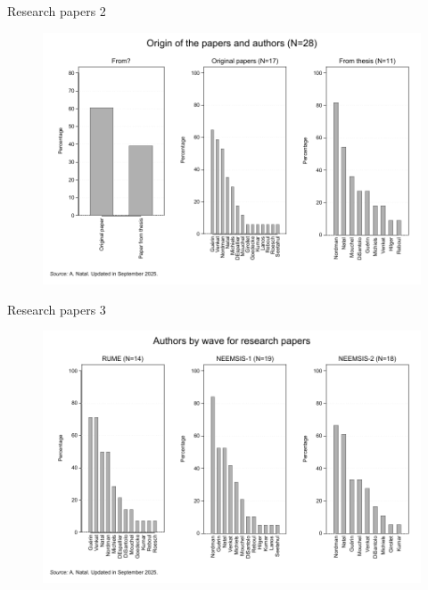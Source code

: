 \documentclass[aspectratio=169]{beamer}
\begin{document}
\begin{frame}{Research papers 2}

\begin{figure}[h]
\centering
\includegraphics[width=0.7\columnwidth]{INPUT/RP_origins}
\end{figure}

\end{frame}



\begin{frame}{Research papers 3}

\begin{figure}[h]
\centering
\includegraphics[width=0.7\columnwidth]{INPUT/RP_authorswave}
\end{figure}

\end{frame}
\end{document}
